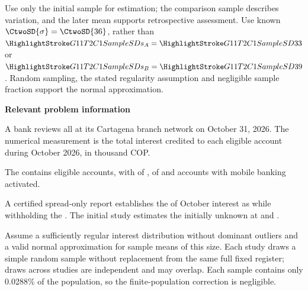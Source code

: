 Use only the initial sample for estimation; the comparison sample describes variation, and the later mean supports retrospective assessment. Use known $\CtwoSD{\sigma}=\CtwoSD{36}$, rather than $\SSD{s_A}=\SSD{33}$ or $\SSD{s_B}=\SSD{39}$. Random sampling, the stated regularity assumption and negligible sample fraction support the normal approximation.

\secInicio[][sec:p2]

\clearpage

\clearpage



\textbf{Relevant problem information}

\begin{probleminfoexcerpt}
A bank reviews all      at its Cartagena branch network on October 31, 2026. The numerical measurement is the total interest credited to each eligible account during October 2026, in thousand COP.
\end{probleminfoexcerpt}

\begin{probleminfoexcerpt}
The     contains  eligible accounts, with    of   ,    of    and  accounts with mobile banking activated.
\end{probleminfoexcerpt}

\begin{probleminfoexcerpt}
A certified spread-only report establishes the    of October interest as    while withholding the  . The initial study estimates the initially unknown   at  and  .
\end{probleminfoexcerpt}

\begin{probleminfoexcerpt}
Assume a sufficiently regular interest distribution without dominant outliers and a valid normal approximation for sample means of this size. Each study draws a simple random sample without replacement from the same full fixed register; draws across studies are independent and may overlap. Each sample contains only 0.0288\% of the population, so the finite-population correction is negligible.
\end{probleminfoexcerpt}

